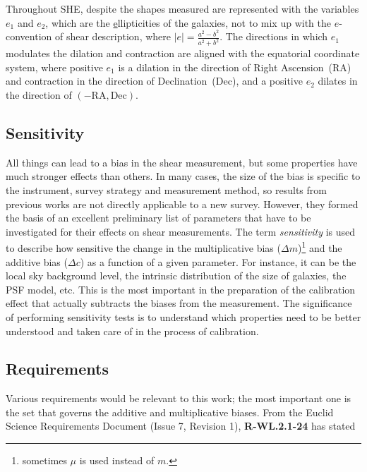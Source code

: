 \documentclass[11pt]{EuclidVIS}
\numberwithin{table}{section}
\numberwithin{figure}{section}
\begin{document}
Throughout SHE, despite the shapes measured are represented with the variables $e_1$ and $e_2$, which are the
\underline{e}llipticities of the galaxies, not to mix up with the $e$-convention of shear
description, where $|e|=\frac{a^2 - b^2}{a^2 + b^2}$. The directions in which $e_1$ modulates the
dilation and contraction are aligned with the equatorial coordinate system, where positive $e_1$ is
a dilation in the direction of Right Ascension~(RA) and contraction in the direction of Declination~(Dec),
and a positive $e_2$ dilates in the direction of $(-\mathrm{RA}, \mathrm{Dec})$.

\subsection{Sensitivity}
All things can lead to a bias in the shear measurement, but some properties have much stronger
effects than others. In many cases, the size of the bias is specific to the instrument, survey
strategy and measurement method, so results from previous works are not directly applicable to a
new survey. However, they formed the basis of an excellent preliminary list of parameters that
have to be investigated for their effects on shear measurements. The term \textit{sensitivity} is
used to describe how sensitive the change in the multiplicative bias ($\Delta m$)\footnote{sometimes
$\mu$ is used instead of $m$.} and the additive
bias ($\Delta c$) as a function of a given parameter. For instance, it can be the local sky
background level, the intrinsic distribution of the size of galaxies, the PSF model, etc.  This is
the most important in the preparation of the calibration effect that actually subtracts the biases
from the measurement. The significance of performing sensitivity tests is to understand which
properties need to be better understood and taken care of in the process of calibration.

\subsection{Requirements}
Various requirements would be relevant to this work; the most important one is the set that governs
the additive and multiplicative biases. From the Euclid Science Requirements Document (Issue 7,
Revision 1), \textbf{R-WL.2.1-24} has stated
\end{document}

